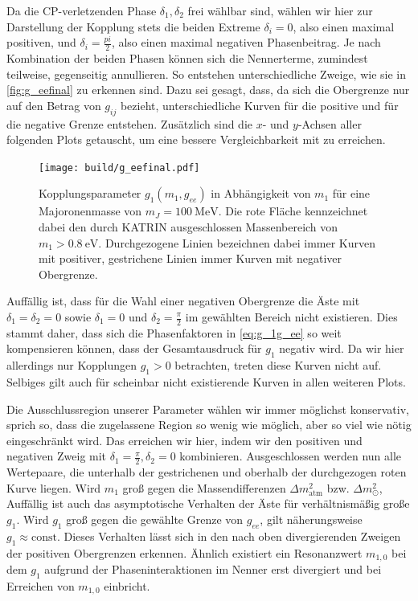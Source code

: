Da die CP-verletzenden Phase $\delta_1,\delta_2$ frei wählbar sind, wählen wir hier zur Darstellung der Kopplung stets die beiden Extreme $\delta_i = 0$, also einen maximal positiven, und $\delta_i = \frac{pi}{2}$, also einen maximal negativen Phasenbeitrag.
Je nach Kombination der beiden Phasen können sich die Nennerterme, zumindest teilweise, gegenseitig annullieren.
So entstehen unterschiedliche Zweige, wie sie in \autoref{fig:g_eefinal} zu erkennen sind.
Dazu sei gesagt, dass, da sich die Obergrenze nur auf den Betrag von $g_{i j}$ bezieht, unterschiedliche Kurven für die positive und für die negative Grenze entstehen.
Zusätzlich sind die $x$- und $y$-Achsen aller folgenden Plots getauscht, um eine bessere Vergleichbarkeit mit \cite{päspaper} zu erreichen.
\begin{figure}[H]
    \centering
    \texttt{[image: build/g\_eefinal.pdf]}
    \caption{Kopplungsparameter $g_1(m_1,g_{ee})$ in Abhängigkeit von $m_1$ für eine Majoronenmasse von $m_J = \SI{100}{\mega\eV}$. Die rote Fläche kennzeichnet dabei den durch KATRIN ausgeschlossen Massenbereich von $m_1 > \SI{0.8}{\eV}$.
    Durchgezogene Linien bezeichnen dabei immer Kurven mit positiver, gestrichene Linien immer Kurven mit negativer Obergrenze.}
    \label{fig:g_eefinal}
\end{figure}
Auffällig ist, dass für die Wahl einer negativen Obergrenze die Äste mit $\delta_1 = \delta_2 = 0$ sowie $\delta_1 = 0$ und $\delta_2 = \frac{\pi}{2}$ im gewählten Bereich nicht existieren.
Dies stammt daher, dass sich die Phasenfaktoren in \eqref{eq:g_1g_ee} so weit kompensieren können, dass der Gesamtausdruck für $g_1$ negativ wird.
Da wir hier allerdings nur Kopplungen $g_1 > 0$ betrachten, treten diese Kurven nicht auf.
Selbiges gilt auch für scheinbar nicht existierende Kurven in allen weiteren Plots.

Die Ausschlussregion unserer Parameter wählen wir immer möglichst konservativ, sprich so, dass die zugelassene Region so wenig wie möglich, aber so viel wie nötig eingeschränkt wird.
Das erreichen wir hier, indem wir den positiven und negativen Zweig mit $\delta_1 = \frac{\pi}{2}, \delta_2 = 0$ kombinieren.
Ausgeschlossen werden nun alle Wertepaare, die unterhalb der gestrichenen und oberhalb der durchgezogen roten Kurve liegen.
Wird $m_1$ groß gegen die Massendifferenzen $\Delta m^2_\text{atm}$ bzw. $\Delta m^2_\odot$,   
Auffällig ist auch das asymptotische Verhalten der Äste für verhältnismäßig große $g_1$.
Wird $g_1$ groß gegen die gewählte Grenze von $g_{ee}$, gilt näherungsweise $g_1 \approx \text{const}$.
Dieses Verhalten lässt sich in den nach oben divergierenden Zweigen der positiven Obergrenzen erkennen.
Ähnlich existiert ein Resonanzwert $m_{1,0}$ bei dem $g_1$ aufgrund der Phaseninteraktionen im Nenner erst divergiert und bei Erreichen von $m_{1,0}$ einbricht.


